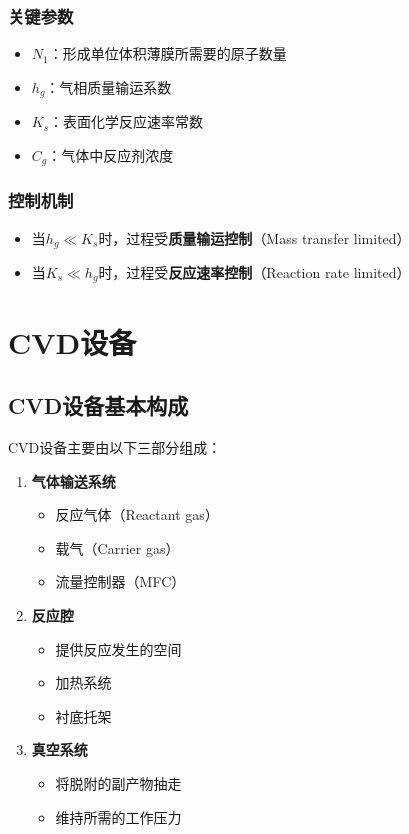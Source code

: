 \documentclass[UTF8,12pt,a4paper]{ctexart}
\begin{document}
\subsubsection{关键参数}

\begin{itemize}
    \item $N_1$：形成单位体积薄膜所需要的原子数量
    \item $h_g$：气相质量输运系数
    \item $K_s$：表面化学反应速率常数
    \item $C_g$：气体中反应剂浓度
\end{itemize}

\subsubsection{控制机制}

\begin{itemize}
    \item 当$h_g \ll K_s$时，过程受\textbf{质量输运控制}（Mass transfer limited）
    \item 当$K_s \ll h_g$时，过程受\textbf{反应速率控制}（Reaction rate limited）
\end{itemize}

\newpage

\section{CVD设备}

\subsection{CVD设备基本构成}

CVD设备主要由以下三部分组成：

\begin{enumerate}
    \item \textbf{气体输送系统}
    \begin{itemize}
        \item 反应气体（Reactant gas）
        \item 载气（Carrier gas）
        \item 流量控制器（MFC）
    \end{itemize}
    
    \item \textbf{反应腔}
    \begin{itemize}
        \item 提供反应发生的空间
        \item 加热系统
        \item 衬底托架
    \end{itemize}
    
    \item \textbf{真空系统}
    \begin{itemize}
        \item 将脱附的副产物抽走
        \item 维持所需的工作压力
    \end{itemize}
\end{enumerate}
\end{document}
